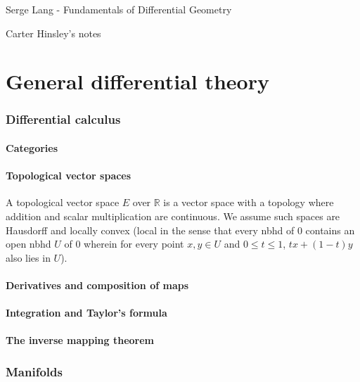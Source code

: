 \documentclass[a4paper]{article}
\newcommand{\R}{\mathbb{R}}
\begin{document}
\begin{center}
\Large{Serge Lang - Fundamentals of Differential Geometry}

\large{Carter Hinsley's notes}
\end{center}

\pagebreak

\part{General differential theory}

\section{Differential calculus}

\subsection{Categories}

\subsection{Topological vector spaces}

A topological vector space $E$ over $\R$ is a vector space with a topology where addition and scalar multiplication are continuous. We assume such spaces are Hausdorff and locally convex (local in the sense that every nbhd of $0$ contains an open nbhd $U$ of $0$ wherein for every point $x, y \in U$ and $0 \leq t \leq 1$, $tx+(1-t)y$ also lies in $U$).

\subsection{Derivatives and composition of maps}

\subsection{Integration and Taylor's formula}

\subsection{The inverse mapping theorem}

\section{Manifolds}
\end{document}
